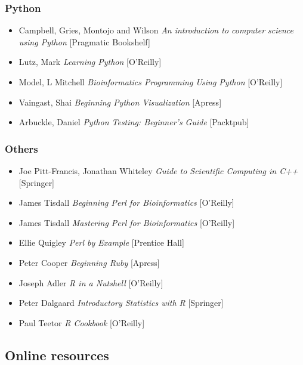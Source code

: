 \documentclass[ChapterTOCs,krantz2]{krantz} %
\begin{document}
\subsubsection{Python}
\begin{itemize}
\item Campbell, Gries, Montojo and Wilson \emph{An introduction to computer
science using Python} [Pragmatic Bookshelf]
\item Lutz, Mark \emph{Learning Python} [O'Reilly]
\item Model, L Mitchell \emph{Bioinformatics Programming Using Python} [O'Reilly]
\item Vaingast, Shai \emph{Beginning Python Visualization} [Apress]
\item Arbuckle, Daniel  \emph{Python Testing: Beginner's Guide} [Packtpub]
\end{itemize}

\subsubsection{Others}
\begin{itemize}
\item Joe Pitt-Francis, Jonathan Whiteley \emph{Guide to Scientific Computing in C++} [Springer]
\item James Tisdall \emph{Beginning Perl for Bioinformatics} [O'Reilly]
\item James Tisdall \emph{Mastering Perl for Bioinformatics} [O'Reilly]
\item Ellie Quigley \emph{Perl by Example} [Prentice Hall]
\item Peter Cooper \emph{Beginning Ruby} [Apress]
\item Joseph Adler \emph{R in a Nutshell} [O'Reilly]
\item Peter Dalgaard \emph{Introductory Statistics with R} [Springer]
\item Paul Teetor \emph{R Cookbook} [O'Reilly]
\end{itemize}

\subsection{Online resources}
\end{document}
